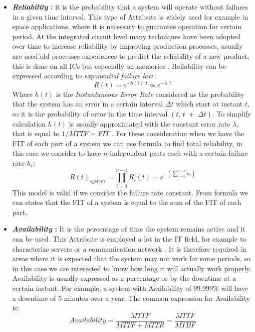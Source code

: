 {{{{\begin{itemize}
					\item \textbf{\textit{Reliability} : } it is the probability that a system will operate without failures in a given time interval. This type of Attribute is widely used for example in space applications, where it is necessary to guarantee operation for certain period.  At the integrated circuit level many techniques have been adopted over time to increase reliability by improving production processes, usually are used old processes experiences to predict the reliability of a new product, this is done on all ICs but especially on memories . Reliability can be expressed according to \textit{exponential failure law} :
					\begin{equation} \label{Reliability1}
						R(t)= e^{-h(t) \:\: t} \simeq e^{-\lambda \:\: t} 
					\end{equation} 
					Where $h(t)$ is the \textit{Instantaneous Error Rate} considered as the probability that the system has an error in a certain interval $\Delta t$ which start at instant $t$, so it is the probability of error in the time interval $(t,\, t\;+\;\Delta t )$. To simplify calculation $h(t)$ is usually approximated with the constant error rate $\lambda$, that is equal to $1/MTTF = FIT$ .
					For these consideration when we have the FIT of each part of a system we can use formula  to find total reliability, in this  case we consider to have $n$ independent parts each with a certain failure rate $h_i$:
					\begin{equation} \label{Reliability2}
						R(t)_{system} = \prod_{i=0}^{n-1}R_i(t) = e^{-\left(\sum_{i=0}^{n-1}h_i\right)}
					\end{equation}
					This model is valid if we consider the failure rate constant. From formula   we can states that the FIT of a system is equal to the sum of the FIT of each part.
					
					\item \textbf{\textit{Availability} : } It is the percentage of time the system remains active and it can be used. This Attribute is employed a lot in the IT field, for example to characterize servers or a communication network   . It is therefore required in areas where it is expected that the system may not work for some periods, so in this case we are interested to know how long it will actually work properly. Availability is usually expressed as a percentage or by the downtime at a certain instant. For example, a system with Availability of 99.999\% will have a downtime of 5 minutes over a year. The common expression for Availability is:
					\begin{equation}
						Availability = \dfrac{MTTF}{MTTF + MTTR} = \frac{MTTF}{MTBF} 
					\end{equation}
					

\end{itemize}}}}}
